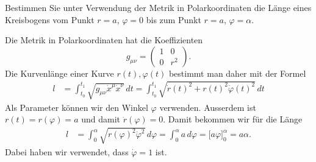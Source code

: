 Bestimmen Sie unter Verwendung der Metrik in Polarkoordinaten die
Länge eines Kreisbogens vom Punkt $r=a$, $\varphi=0$ bis
zum Punkt $r=a$, $\varphi=\alpha$.

\begin{loesung}
Die Metrik in Polarkoordinaten hat die Koeffizienten
\[
g_{\mu\nu}
=
\begin{pmatrix}
1&0\\0&r^2
\end{pmatrix}.
\]
Die Kurvenlänge einer Kurve $r(t), \varphi(t)$ bestimmt man daher mit
der Formel
\begin{align*}
l
&=
\int_{t_0}^{t_1}
\sqrt{g_{\mu\nu} \dot x^\mu \dot x^\nu}\,dt
=
\int_{t_0}^{t_1}
\sqrt{\dot r(t)^2 + r(t)^2\dot\varphi(t)^2}\,dt
\end{align*}
Als Parameter können wir den Winkel $\varphi$ verwenden.
Ausserdem ist $r(t)=r(\varphi)=a$ und damit $\dot r(\varphi)=0$.
Damit bekommen wir für die Länge
\begin{align*}
l
&=
\int_0^{\alpha} \sqrt{r(\varphi)^2\dot \varphi^2}\,d\varphi
=
\int_0^{\alpha}
a
\,d\varphi
=
\bigl[a\varphi\bigr]_0^{\alpha}
=
a\alpha.
\end{align*}
Dabei haben wir verwendet, dass $\dot\varphi=1$ ist.
\end{loesung}

